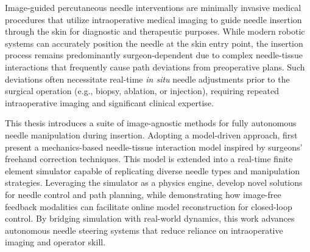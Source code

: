 




Image-guided percutaneous needle interventions are minimally invasive medical procedures that utilize intraoperative medical imaging to guide needle insertion through the skin for diagnostic and therapeutic purposes. While modern robotic systems can accurately position the needle at the skin entry point, the insertion process remains predominantly surgeon-dependent due to complex needle-tissue interactions that frequently cause path deviations from preoperative plans. Such deviations often necessitate real-time \textit{in situ} needle adjustments prior to the surgical operation (e.g., biopsy, ablation, or injection), requiring repeated intraoperative imaging and significant clinical expertise.

This thesis introduces a suite of image-agnostic methods for fully autonomous needle manipulation during insertion. Adopting a model-driven approach,  first present a mechanics-based needle-tissue interaction model inspired by surgeons' freehand correction techniques. This model is extended into a real-time finite element simulator capable of replicating diverse needle types and manipulation strategies. Leveraging the simulator as a physics engine,  develop novel solutions for needle control and path planning, while demonstrating how image-free feedback modalities can facilitate online model reconstruction for closed-loop control. By bridging simulation with real-world dynamics, this work advances autonomous needle steering systems that reduce reliance on intraoperative imaging and operator skill.

